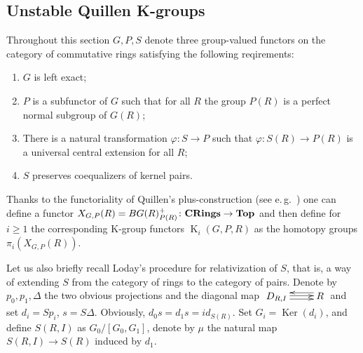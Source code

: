 \documentclass[oneside, 8pt]{amsart}
\theoremstyle{remark}
\theoremstyle{definition}
\DeclareMathOperator{\Ker}{Ker}
\DeclareMathOperator{\K}{K}
\newcommand{\catname}[1]{{\normalfont\textbf{#1}}} %
\numberwithin{equation}{section}
\begin{document}
\subsection{Unstable Quillen K-groups} \label{sec:quillen}
Throughout this section $G, P, S$ denote three group-valued functors on the category of commutative rings satisfying the following reqirements:
\begin{enumerate}
 \item \label{req:left-exact} $G$ is left exact;
 \item \label{req:subfunc} $P$ is a subfunctor of $G$ such that for all $R$ the group $P(R)$ is a perfect normal subgroup of $G(R)$;
 \item \label{req:uce} There is a natural transformation $\varphi \colon S \to P$ such that $ \varphi \colon S(R) \to P(R)$ is a universal central extension for all $R$;
 \item \label{req:coeq} $S$ preserves coequalizers of kernel pairs.
\end{enumerate}

Thanks to the functoriality of Quillen's plus-construction (see e.\,g.~\cite[Proposition~5.2.4]{Ro95}) one can define a functor 
$X_{G, P}(R) = BG(R)^+_{P(R)} \colon \catname{CRings} \to \catname{Top}$ and then define for $i \geq 1$ the corresponding K-group functors $\K_{i}(G, P, R)$ as the homotopy groups $\pi_i(X_{G, P}(R))$.

Let us also briefly recall Loday's procedure for relativization of $S$, that is,
 a way of extending $S$ from the category of rings to the category of pairs.
Denote by $p_0, p_1, \Delta$ the two obvious projections and the diagonal map $\xymatrix{D_{R,I} \ar@<1pt>[r] \ar@<-2.5pt>[r] & \ar@<-4pt>[l] R}$
  and set $d_i = Sp_i$, $s = S\Delta$.
 Obviously, $d_0s = d_1 s = id_{S(R)}$. Set $G_i = \Ker(d_i)$, and define $S(R, I)$ as $ G_0 / [G_0, G_1]$, denote by $\mu$ the natural map $S(R, I) \to S(R)$ induced by $d_1$.
\end{document}
